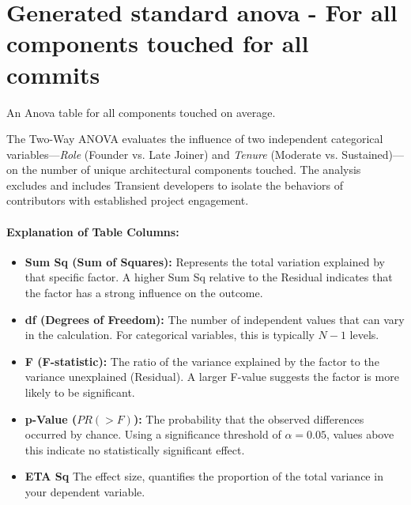 \section{Generated standard anova - For all components touched for all commits} 
An Anova table for all components touched on average. 

The Two-Way ANOVA evaluates the influence of two independent categorical variables—\textit{Role} (Founder vs. Late Joiner) and \textit{Tenure} (Moderate vs. Sustained)—on the number of unique architectural components touched. The analysis excludes and includes Transient developers to isolate the behaviors of contributors with established project engagement.

\paragraph{Explanation of Table Columns:}
\begin{itemize}
    \item \textbf{Sum Sq (Sum of Squares):} Represents the total variation explained by that specific factor. A higher Sum Sq relative to the Residual indicates that the factor has a strong influence on the outcome.
    \item \textbf{df (Degrees of Freedom):} The number of independent values that can vary in the calculation. For categorical variables, this is typically $N-1$ levels.
    \item \textbf{F (F-statistic):} The ratio of the variance explained by the factor to the variance unexplained (Residual). A larger F-value suggests the factor is more likely to be significant.
    \item \textbf{p-Value ($PR(>F)$):} The probability that the observed differences occurred by chance. Using a significance threshold of $\alpha = 0.05$, values above this indicate no statistically significant effect.
    \item \textbf{ETA Sq} The effect size, quantifies the proportion of the total variance in your dependent variable. 
\end{itemize}

